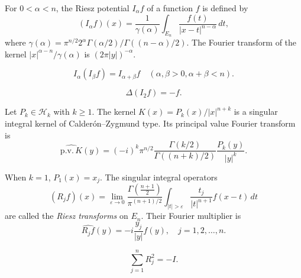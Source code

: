 \begin{theorem}\label{thm:c4-4-1}
For $0 < \alpha < n$, the Riesz potential $I_\alpha f$ of a function $f$ is defined by
\begin{equation}\label{eq:c4-4-2}
(I_\alpha f)(x) = \frac{1}{\gamma(\alpha)} \int_{E_n} \frac{f(t)}{|x - t|^{n - \alpha}}\,dt,
\end{equation}
where $\gamma(\alpha) = \pi^{n/2} 2^\alpha \Gamma(\alpha/2) / \Gamma((n - \alpha)/2)$. The Fourier transform of the kernel $|x|^{\alpha - n} / \gamma(\alpha)$ is $(2\pi |y|)^{-\alpha}$.
\end{theorem}

\begin{equation}\label{eq:c4-4-3}
I_\alpha(I_\beta f) = I_{\alpha + \beta} f \quad (\alpha, \beta > 0, \alpha + \beta < n).
\end{equation}

\begin{equation}\label{eq:c4-4-4}
\Delta(I_2 f) = -f.
\end{equation}

\begin{theorem}\label{thm:c4-4-5}
Let $P_k \in \mathcal{H}_k$ with $k \geq 1$. The kernel $K(x) = P_k(x) / |x|^{n + k}$ is a singular integral kernel of Calder\'on--Zygmund type. Its principal value Fourier transform is
\begin{equation}\label{eq:c4-4-6}
\widehat{\text{p.v.}\,K}(y) = (-i)^k \pi^{n/2} \frac{\Gamma(k/2)}{\Gamma((n + k)/2)} \frac{P_k(y)}{|y|^k}.
\end{equation}
\end{theorem}

\begin{theorem}\label{thm:c4-4-7}
When $k = 1$, $P_1(x) = x_j$. The singular integral operators
\begin{equation}\label{eq:c4-4-8}
(R_j f)(x) = \lim_{\varepsilon \to 0} \frac{\Gamma\left(\frac{n+1}{2}\right)}{\pi^{(n+1)/2}} \int_{|t| > \varepsilon} \frac{t_j}{|t|^{n+1}} f(x - t)\,dt
\end{equation}
are called the \emph{Riesz transforms} on $E_n$. Their Fourier multiplier is
\begin{equation}\label{eq:c4-4-9}
\widehat{R_j f}(y) = -i \frac{y_j}{|y|} \hat{f}(y), \quad j = 1, 2, \dots, n.
\end{equation}
\end{theorem}

\begin{equation}\label{eq:c4-4-10}
\sum_{j=1}^n R_j^2 = -I.
\end{equation}

